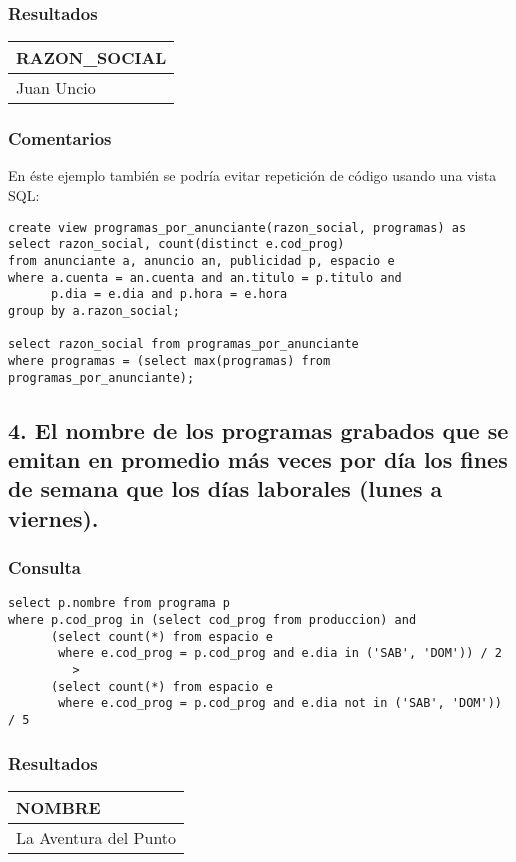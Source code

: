 \subsubsection*{Resultados}
\begin{tabular}{|l|}
  \hline
    \bf{RAZON\_SOCIAL} \\ 
  \hline
    Juan Uncio \\ 
  \hline
\end{tabular} 

\subsubsection*{Comentarios}
En \'este ejemplo tambi\'en se podr\'ia evitar repetici\'on de c\'odigo usando una vista SQL:

\begin{lstlisting} 
create view programas_por_anunciante(razon_social, programas) as
select razon_social, count(distinct e.cod_prog)
from anunciante a, anuncio an, publicidad p, espacio e
where a.cuenta = an.cuenta and an.titulo = p.titulo and 
      p.dia = e.dia and p.hora = e.hora
group by a.razon_social;

select razon_social from programas_por_anunciante
where programas = (select max(programas) from programas_por_anunciante);

\end{lstlisting}

\subsection*{4. \normalsize{El nombre de los programas grabados que se emitan en promedio m\'as veces por d\'ia los fines de semana que los d\'ias laborales (lunes a viernes).}}

\subsubsection*{Consulta}
\begin{lstlisting} 
select p.nombre from programa p
where p.cod_prog in (select cod_prog from produccion) and
      (select count(*) from espacio e 
       where e.cod_prog = p.cod_prog and e.dia in ('SAB', 'DOM')) / 2 
         >
      (select count(*) from espacio e 
       where e.cod_prog = p.cod_prog and e.dia not in ('SAB', 'DOM')) / 5
\end{lstlisting}

\subsubsection*{Resultados}
\begin{tabular}{|l|}
  \hline
    \bf{NOMBRE} \\ 
  \hline
    La Aventura del Punto \\ 
  \hline
\end{tabular} 

